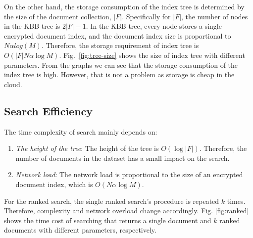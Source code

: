 \documentclass[sigconf,pdftex]{acmart}
\begin{document}
 
 On the other hand, the storage consumption of the index tree is determined by the size of the document collection, $|F|$. Specifically for $|F|$, the number of nodes in the KBB tree is $2|F|-1$. In the KBB tree, every node stores a single encrypted document index, and the document index size is proportional to $N \alpha log(M)$. Therefore, the storage requirement of index tree is $O(|F| N \alpha  \log{M})$. Fig.~\ref{fig:tree-size} shows the size of index tree with different parameters. From the graphs we can see that the storage consumption of the index tree is high. However, that is not a problem as storage is cheap in the cloud.



\subsection{Search Efficiency}


The time complexity of search mainly depends on:

\begin{enumerate}
    \item \textit{The height of the tree}: The height of the tree is $O( \log{|F|} )$. Therefore, the number of documents in the dataset has a small impact on the search.
    
    \item \textit{Network load}: The network load is proportional to the size of an encrypted document index, which is $O(N \alpha \log{M})$.
    
\end{enumerate} 

 For the ranked search, the single ranked search's procedure is repeated $k$ times. Therefore, complexity and network overload change accordingly. Fig. \ref{fig:ranked} shows the time cost of searching that returns a single document and $k$ ranked documents with different parameters, respectively. 
\end{document}
